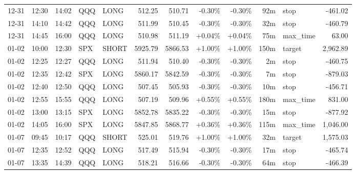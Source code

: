 \documentclass[11pt,a4paper,twoside]{article}
\begin{document}
\begin{center}
\begin{longtable}{>{\color{txtmain}}l l l l l r r r r r >{\color{txtmain}}l r}
12-31 & 12:30 & 14:02 & QQQ & LONG & 512.25 & 510.71 & \textcolor{lossred}{-0.30\%} & \textcolor{lossred}{-0.30\%} & 92m & stop & \textcolor{lossred}{-461.02} \\
12-31 & 14:10 & 14:42 & QQQ & LONG & 511.99 & 510.45 & \textcolor{lossred}{-0.30\%} & \textcolor{lossred}{-0.30\%} & 32m & stop & \textcolor{lossred}{-460.79} \\
12-31 & 14:45 & 16:00 & QQQ & LONG & 510.98 & 511.19 & \textcolor{wingreen}{+0.04\%} & \textcolor{wingreen}{+0.04\%} & 75m & max\_time & \textcolor{wingreen}{63.00} \\
01-02 & 10:00 & 12:30 & SPX & SHORT & 5925.79 & 5866.53 & \textcolor{wingreen}{+1.00\%} & \textcolor{wingreen}{+1.00\%} & 150m & target & \textcolor{wingreen}{2,962.89} \\
01-02 & 12:25 & 12:27 & QQQ & LONG & 511.94 & 510.40 & \textcolor{lossred}{-0.30\%} & \textcolor{lossred}{-0.30\%} & 2m & stop & \textcolor{lossred}{-460.75} \\
01-02 & 12:35 & 12:42 & SPX & LONG & 5860.17 & 5842.59 & \textcolor{lossred}{-0.30\%} & \textcolor{lossred}{-0.30\%} & 7m & stop & \textcolor{lossred}{-879.03} \\
01-02 & 12:40 & 12:50 & QQQ & LONG & 507.45 & 505.93 & \textcolor{lossred}{-0.30\%} & \textcolor{lossred}{-0.30\%} & 10m & stop & \textcolor{lossred}{-456.71} \\
01-02 & 12:55 & 15:55 & QQQ & LONG & 507.19 & 509.96 & \textcolor{wingreen}{+0.55\%} & \textcolor{wingreen}{+0.55\%} & 180m & max\_time & \textcolor{wingreen}{831.00} \\
01-02 & 13:00 & 13:15 & SPX & LONG & 5852.78 & 5835.22 & \textcolor{lossred}{-0.30\%} & \textcolor{lossred}{-0.30\%} & 15m & stop & \textcolor{lossred}{-877.92} \\
01-02 & 14:05 & 16:00 & SPX & LONG & 5847.85 & 5868.77 & \textcolor{wingreen}{+0.36\%} & \textcolor{wingreen}{+0.36\%} & 115m & max\_time & \textcolor{wingreen}{1,046.00} \\
01-07 & 09:45 & 10:17 & QQQ & SHORT & 525.01 & 519.76 & \textcolor{wingreen}{+1.00\%} & \textcolor{wingreen}{+1.00\%} & 32m & target & \textcolor{wingreen}{1,575.03} \\
01-07 & 12:35 & 12:52 & QQQ & LONG & 517.49 & 515.94 & \textcolor{lossred}{-0.30\%} & \textcolor{lossred}{-0.30\%} & 17m & stop & \textcolor{lossred}{-465.74} \\
01-07 & 13:35 & 14:39 & QQQ & LONG & 518.21 & 516.66 & \textcolor{lossred}{-0.30\%} & \textcolor{lossred}{-0.30\%} & 64m & stop & \textcolor{lossred}{-466.39} \\

\end{longtable}
\end{center}
\end{document}
